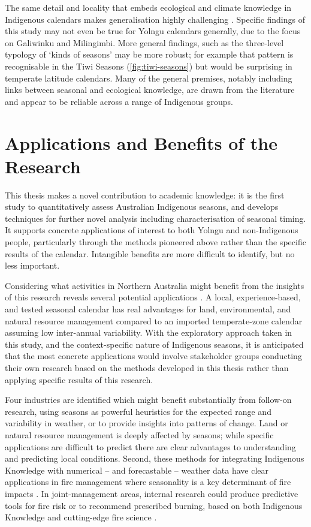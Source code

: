 The same detail and locality that embeds ecological and climate knowledge in
Indigenous calendars makes generalisation highly challenging
\citep[][came to similar conclusions]{barber2005,davis1989}.  Specific
findings of this study may not even be true for Yolngu calendars generally,
due to the focus on Galiwinku and Milingimbi.  More general findings, such as
the three-level typology of `kinds of seasons' may be more robust; for example
that pattern is recognisable in the Tiwi Seasons (\cref{fig:tiwi-seasons})
but would be surprising in temperate latitude calendars.  Many of the general premises, notably
including links between seasonal and ecological knowledge, are drawn from the
literature and appear to be reliable across a range of Indigenous groups.




\section{Applications and Benefits of the Research}
\label{sec:applications-benefits}

This thesis makes a novel contribution to academic knowledge: it is the
first study to quantitatively assess Australian Indigenous seasons, and
develops techniques for further novel analysis including characterisation
of seasonal timing.
%
It supports concrete applications of interest to both Yolngu and
non-Indigenous people, particularly through the methods pioneered above
rather than the specific results of the calendar.  Intangible benefits
are more difficult to identify, but no less important.


Considering what activities in Northern Australia might benefit from the
insights of this research reveals several potential applications
\citep[see][for examples]{whitepaper}.  A local, experience-based, and tested seasonal calendar has real
advantages for land, environmental, and natural resource management compared
to an imported temperate-zone calendar assuming low inter-annual variability.
%
With the exploratory approach taken in this study, and the context-specific
nature of Indigenous seasons, it is anticipated that the most concrete applications
would involve stakeholder groups conducting their own research based on the
methods developed in this thesis rather than applying specific results of this research.


Four industries are identified which might benefit substantially from follow-on
research, using seasons as powerful heuristics for the expected range
and variability in weather, or to provide insights into patterns of change.
%
Land or natural resource management is deeply affected by seasons; while
specific applications are difficult to predict there are clear advantages
to understanding and predicting local conditions.
%
Second, these methods for integrating Indigenous Knowledge with numerical --
and forecastable -- weather data have clear applications in fire management
where seasonality is a key determinant of fire impacts \citep{driscoll2010}.
In joint-management areas, internal research could produce predictive tools
for fire risk or to recommend prescribed burning, based on both Indigenous
Knowledge and cutting-edge fire science \citep[see eg.][]{bowman2003,yibarbuk2001}.

